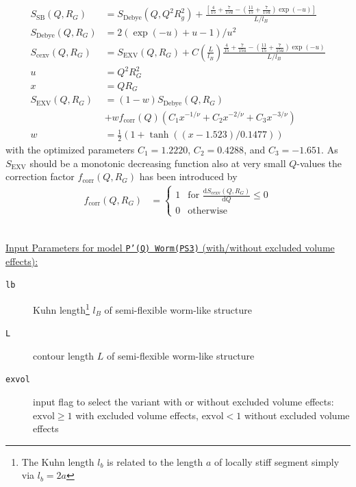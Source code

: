 \begin{align}
S_\textrm{SB}(Q,R_G) &= S_\mathrm{Debye}(Q,Q^2 R_g^2)+
    \frac{\left[\frac{4}{15} +\frac{7}{15u}-\left(\frac{11}{15}+\frac{7}{15u}\right)\exp(-u)\right]}{L/l_B}\\
S_\textrm{Debye}(Q,R_G) &= 2\left(\exp(-u)+u-1\right)/u^2\\
S_\textrm{cexv}(Q,R_G) &= S_\textrm{EXV}(Q,R_G)  +C\left(\frac{L}{l_B}\right)\frac{\frac{4}{15}+\frac{7}{15u}-\left(\frac{11}{15}+\frac{7}{15u}\right)\exp(-u)}{L/l_B} \\
u &= Q^2R_G^2 \\
x &= QR_G \\
S_\textrm{EXV}(Q,R_G) &= (1-w)S_\textrm{Debye}(Q,R_G) \\
&+ w f_\textrm{corr}(Q) \left(C_1x^{-1/\nu}+C_2x^{-2/\nu}+C_3x^{-3/\nu}\right) \nonumber \\
w &= \frac12\left(1+\tanh((x-1.523)/0.1477)\right)
\end{align}
with the optimized parameters $C_1 = 1.2220$, $C_2 = 0.4288$, and $C_3 = -1.651$.
As $S_\textrm{EXV}$ should be a monotonic decreasing function also at very small $Q$-values the correction factor $f_\textrm{corr}(Q,R_G)$ has been introduced by \cite{Chen2006}
\begin{align}
f_\textrm{corr}(Q,R_G) &=
\begin{cases}
1 & \mbox{for~} \frac{\mathrm{d}S_\textrm{cexv}(Q,R_G)}{\mathrm{d}Q} \leq 0\\
0 & \mbox{otherwise}
\end{cases}
\end{align}
\vspace{5mm}

\hspace{1pt}\\
\uline{Input Parameters for model \texttt{P'(Q) Worm(PS3)} (with/without excluded volume effects):}\\
\begin{description}
\item[\texttt{lb}] Kuhn length\footnote{The Kuhn length $l_b$ is related to the length $a$ of
    locally stiff segment simply via $l_b=2a$} $l_B$ of semi-flexible worm-like structure
\item[\texttt{L}] contour length $L$ of semi-flexible worm-like structure
\item[\texttt{exvol}] input flag to select the variant with or without excluded volume effects: $\mathrm{exvol} \geq 1$ with excluded volume effects, $\mathrm{exvol} < 1$ without excluded volume effects
\end{description}

